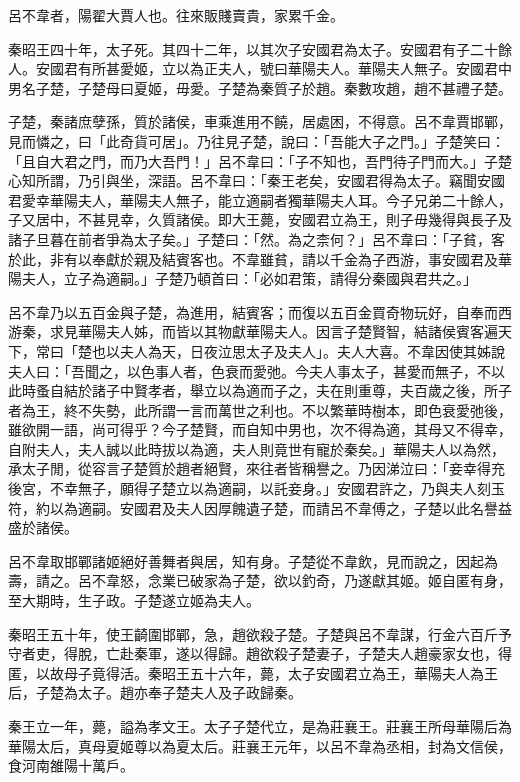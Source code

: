 
\begin{pinyinscope}
呂不韋者，陽翟大賈人也。往來販賤賣貴，家累千金。

秦昭王四十年，太子死。其四十二年，以其次子安國君為太子。安國君有子二十餘人。安國君有所甚愛姬，立以為正夫人，號曰華陽夫人。華陽夫人無子。安國君中男名子楚，子楚母曰夏姬，毋愛。子楚為秦質子於趙。秦數攻趙，趙不甚禮子楚。

子楚，秦諸庶孽孫，質於諸侯，車乘進用不饒，居處困，不得意。呂不韋賈邯鄲，見而憐之，曰「此奇貨可居」。乃往見子楚，說曰：「吾能大子之門。」子楚笑曰：「且自大君之門，而乃大吾門！」呂不韋曰：「子不知也，吾門待子門而大。」子楚心知所謂，乃引與坐，深語。呂不韋曰：「秦王老矣，安國君得為太子。竊聞安國君愛幸華陽夫人，華陽夫人無子，能立適嗣者獨華陽夫人耳。今子兄弟二十餘人，子又居中，不甚見幸，久質諸侯。即大王薨，安國君立為王，則子毋幾得與長子及諸子旦暮在前者爭為太子矣。」子楚曰：「然。為之柰何？」呂不韋曰：「子貧，客於此，非有以奉獻於親及結賓客也。不韋雖貧，請以千金為子西游，事安國君及華陽夫人，立子為適嗣。」子楚乃頓首曰：「必如君策，請得分秦國與君共之。」

呂不韋乃以五百金與子楚，為進用，結賓客；而復以五百金買奇物玩好，自奉而西游秦，求見華陽夫人姊，而皆以其物獻華陽夫人。因言子楚賢智，結諸侯賓客遍天下，常曰「楚也以夫人為天，日夜泣思太子及夫人」。夫人大喜。不韋因使其姊說夫人曰：「吾聞之，以色事人者，色衰而愛弛。今夫人事太子，甚愛而無子，不以此時蚤自結於諸子中賢孝者，舉立以為適而子之，夫在則重尊，夫百歲之後，所子者為王，終不失勢，此所謂一言而萬世之利也。不以繁華時樹本，即色衰愛弛後，雖欲開一語，尚可得乎？今子楚賢，而自知中男也，次不得為適，其母又不得幸，自附夫人，夫人誠以此時拔以為適，夫人則竟世有寵於秦矣。」華陽夫人以為然，承太子閒，從容言子楚質於趙者絕賢，來往者皆稱譽之。乃因涕泣曰：「妾幸得充後宮，不幸無子，願得子楚立以為適嗣，以託妾身。」安國君許之，乃與夫人刻玉符，約以為適嗣。安國君及夫人因厚餽遺子楚，而請呂不韋傅之，子楚以此名譽益盛於諸侯。

呂不韋取邯鄲諸姬絕好善舞者與居，知有身。子楚從不韋飲，見而說之，因起為壽，請之。呂不韋怒，念業已破家為子楚，欲以釣奇，乃遂獻其姬。姬自匿有身，至大期時，生子政。子楚遂立姬為夫人。

秦昭王五十年，使王齮圍邯鄲，急，趙欲殺子楚。子楚與呂不韋謀，行金六百斤予守者吏，得脫，亡赴秦軍，遂以得歸。趙欲殺子楚妻子，子楚夫人趙豪家女也，得匿，以故母子竟得活。秦昭王五十六年，薨，太子安國君立為王，華陽夫人為王后，子楚為太子。趙亦奉子楚夫人及子政歸秦。

秦王立一年，薨，謚為孝文王。太子子楚代立，是為莊襄王。莊襄王所母華陽后為華陽太后，真母夏姬尊以為夏太后。莊襄王元年，以呂不韋為丞相，封為文信侯，食河南雒陽十萬戶。


\end{pinyinscope}
